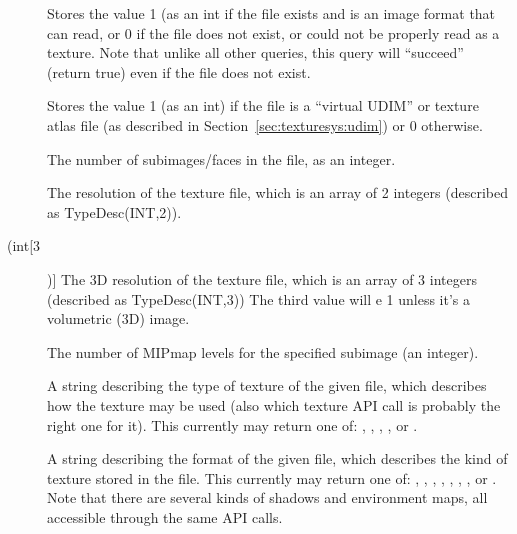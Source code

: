 \begin{description}
\item[\spc] \spc \vspace{-12pt} 

\item[\rm {}] Stores the value 1 (as an {\cf int} if the file
exists and is an image format that \product can read, or 0 if the file
does not exist, or could not be properly read as a texture. Note that
unlike all other queries, this query will ``succeed'' (return {\cf true})
even if the file does not exist.

\item[\rm {}] Stores the value 1 (as an {\cf int}) if the file
is a ``virtual UDIM'' or texture atlas file (as described in
Section~\ref{sec:texturesys:udim}) or 0 otherwise.

\item[\rm {}] The number of subimages/faces in the file, as an integer.

\item[\rm {}] The resolution of the texture file, which
is an array of 2 integers (described as {\cf TypeDesc(INT,2)}).

\item[\rm {} (int[3])] The 3D resolution of the texture file, which
is an array of 3 integers (described as {\cf TypeDesc(INT,3)})  The
third value will e 1 unless it's a volumetric (3D) image.

\item[\rm {}] The number of MIPmap levels for the specified
subimage (an integer).

\item[\rm {}] A string describing the type of texture
of the given file, which describes how the texture may be used (also
which texture API call is probably the right one for it).
This currently may return one of: , ,
, , 
or .

\item[\rm {}] A string describing the format of the
given file, which describes the kind of texture stored in the file.
This currently may return one of: , ,
, , , , , or .
Note that there are several kinds of shadows and environment maps,
all accessible through the same API calls.


\end{description}

